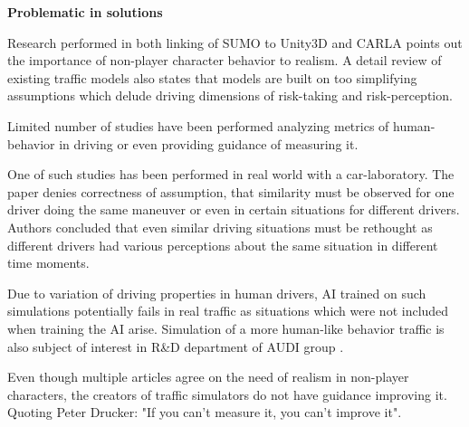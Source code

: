 \documentclass{VUMIFPS-master-intro}
\begin{document}
\textbf{Problematic in solutions}

Research performed in both linking of SUMO to Unity3D and CARLA points out the importance of non-player character behavior to realism. A detail review \cite{Eskandarian2017} of existing traffic models also states that models are built on too simplifying assumptions which delude driving dimensions of risk-taking and risk-perception.


Limited number of studies have been performed analyzing metrics of human-behavior in driving or even providing guidance of measuring it. 

One of such studies has been performed in real world with a car-laboratory. The paper denies correctness of assumption, that similarity must be observed for one driver doing the same maneuver or even in certain situations for different drivers. Authors concluded that even similar driving situations must be rethought as different drivers had various perceptions about the same situation in different time moments. \cite{Blaszczyk2015}


Due to variation of driving properties in human drivers, AI trained on such simulations potentially fails in real traffic as situations which were not included when training the AI arise. Simulation of a more human-like behavior traffic is also subject of interest in R\&D department of AUDI group \cite{AUDI2018}.

Even though multiple articles agree on the need of realism in non-player characters, the creators of traffic simulators do not have guidance improving it. Quoting Peter Drucker: "If you can't measure it, you can't improve it".


\end{document}
